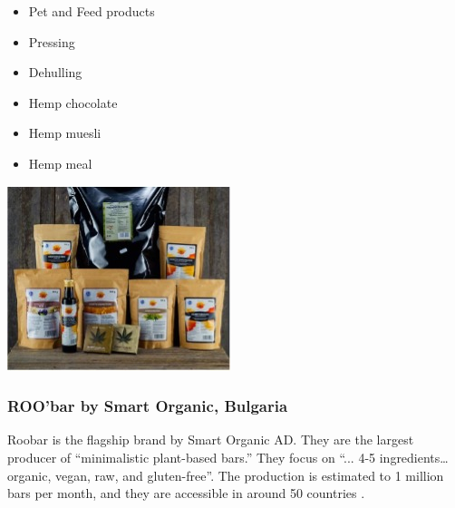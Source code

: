 \begin{minipage}{0.6\textwidth}
    \begin{itemize}
        \item Pet and Feed products
        \item Pressing
        \item Dehulling
        \item Hemp chocolate
        \item Hemp muesli
        \item Hemp meal
    \end{itemize}
    \end{minipage}%
    \hfill
    \begin{minipage}{0.35\textwidth}
        \centering
        \includegraphics[width=\linewidth]{Figures/fig_02.jpg}
        \label{fig:introduction_02}
    \end{minipage}

\subsubsection*{ROO'bar by Smart Organic, Bulgaria}
Roobar is the flagship brand by Smart Organic AD. They are the largest producer of “minimalistic plant-based bars.” They focus on “... 4-5 ingredients… organic, vegan, raw, and gluten-free”. The production is estimated to 1 million bars per month, and they are accessible in around 50 countries \cite*{SmartOrganicRoobar}. 

